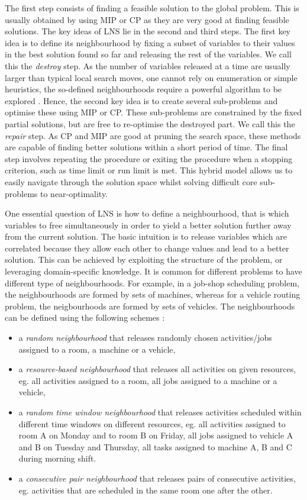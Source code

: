 The first step consists of finding a feasible solution to the global problem. This is usually obtained by using MIP or CP as they are very good at finding feasible solutions. The key ideas of LNS lie in the second and third steps. The first key idea is to define its neighbourhood by fixing a subset of variables to their values in the best solution found so far and releasing the rest of the variables. We call this the \textsl{destroy} step. As the number of variables released at a time are usually larger than typical local search moves, one cannot rely on enumeration or simple heuristics, the so-defined neighbourhoods require a powerful algorithm to be explored \citep{danna2003structured}. Hence, the second key idea is to create several sub-problems and optimise these using MIP or CP. These sub-problems are constrained by the fixed partial solutions, but are free to re-optimise the destroyed part. We call this the \textsl{repair} step. As CP and MIP are good at pruning the search space, these methods are capable of finding better solutions within a short period of time. The final step involves repeating the procedure or exiting the procedure when a stopping criterion, such as time limit or run limit is met. This hybrid model allows us to easily navigate through the solution space whilst solving difficult core sub-problems to near-optimality. 

One essential question of LNS is how to define a neighbourhood, that is which variables to free simultaneously in order to yield a better solution further away from the current solution. The basic intuition is to release variables which are correlated because they allow each other to change values and lead to a better solution. This can be achieved by exploiting the structure of the problem, or leveraging domain-specific knowledge. It is common for different problems to have different type of neighbourhoods. For example, in a job-shop scheduling problem, the neighbourhoods are formed by sets of machines, whereas for a vehicle routing problem, the neigbourhoods are formed by sets of vehicles. The neighbourhoods can be defined using the following schemes \citep{danna2003structured}:
\begin{itemize}
	\item a \textsl{random neighbourhood} that releases randomly chosen activities/jobs assigned to a room, a machine or a vehicle,
	\item a \textsl{resource-based neighbourhood} that releases all activities on given resources, eg. all activities assigned to a room, all jobs assigned to a machine or a vehicle,
	\item a \textsl{random time window neighbourhood} that releases activities scheduled within different time windows on different resources, eg. all activities assigned to room A on Monday and to room B on Friday, all jobs assigned to vehicle A and B on Tuesday and Thursday, all tasks assigned to machine A, B and C during morning shift.
	\item a \textsl{consecutive pair neighbourhood} that releases pairs of consecutive activities, eg. activities that are scheduled in the same room one after the other.	
\end{itemize}

